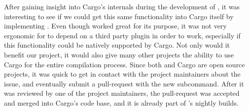 After gaining insight into Cargo's internals during the development of , it was interesting to see if we could get this same functionality into Cargo itself by implementing .
Even though  worked great for its purpose, it was not very ergonomic for {\emlib} to depend on a third party plugin in order to work, especially if this functionality could be natively supported by Cargo.
Not only would it benefit our project, it would also give many other {\rust} projects the ability to use Cargo for the entire compilation process.
Since both {\rust} and Cargo are open source projects, it was quick to get in contact with the project maintainers about the issue, and eventually submit a pull-request with the new subcommand.
After it was reviewed by one of the project maintainers, the pull-request was accepted and merged into Cargo's code base, and it is already part of {\rust}'s nightly builds.
